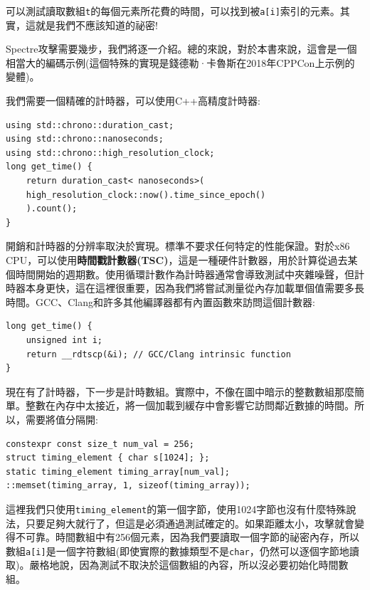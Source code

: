 可以測試讀取數組\texttt{t}的每個元素所花費的時間，可以找到被\texttt{a[i]}索引的元素。其實，這就是我們不應該知道的祕密!


Spectre攻擊需要幾步，我們將逐一介紹。總的來說，對於本書來說，這會是一個相當大的編碼示例(這個特殊的實現是錢德勒·卡魯斯在2018年CPPCon上示例的變體)。

我們需要一個精確的計時器，可以使用C++高精度計時器:

\begin{lstlisting}[style=styleCXX]
using std::chrono::duration_cast;
using std::chrono::nanoseconds;
using std::chrono::high_resolution_clock;
long get_time() {
	return duration_cast< nanoseconds>(
	high_resolution_clock::now().time_since_epoch()
	).count();
}
\end{lstlisting}

開銷和計時器的分辨率取決於實現。標準不要求任何特定的性能保證。對於x86 CPU，可以使用\textbf{時間戳計數器(TSC)}，這是一種硬件計數器，用於計算從過去某個時間開始的週期數。使用循環計數作為計時器通常會導致測試中夾雜噪聲，但計時器本身更快，這在這裡很重要，因為我們將嘗試測量從內存加載單個值需要多長時間。GCC、Clang和許多其他編譯器都有內置函數來訪問這個計數器:

\begin{lstlisting}[style=styleCXX]
long get_time() {
	unsigned int i;
	return __rdtscp(&i); // GCC/Clang intrinsic function
}
\end{lstlisting}

現在有了計時器，下一步是計時數組。實際中，不像在圖中暗示的整數數組那麼簡單。整數在內存中太接近，將一個加載到緩存中會影響它訪問鄰近數據的時間。所以，需要將值分隔開:

\begin{lstlisting}[style=styleCXX]
constexpr const size_t num_val = 256;
struct timing_element { char s[1024]; };
static timing_element timing_array[num_val];
::memset(timing_array, 1, sizeof(timing_array));
\end{lstlisting}

這裡我們只使用\texttt{timing\_element}的第一個字節，使用1024字節也沒有什麼特殊說法，只要足夠大就行了，但這是必須通過測試確定的。如果距離太小，攻擊就會變得不可靠。時間數組中有256個元素，因為我們要讀取一個字節的祕密內存，所以數組\texttt{a[i]}是一個字符數組(即使實際的數據類型不是\texttt{char}，仍然可以逐個字節地讀取)。嚴格地說，因為測試不取決於這個數組的內容，所以沒必要初始化時間數組。

